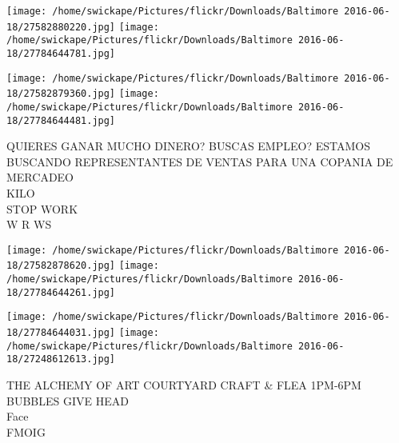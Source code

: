 \documentclass[10pt,letterpaper]{article}
\begin{document}
\texttt{[image: /home/swickape/Pictures/flickr/Downloads/Baltimore 2016-06-18/27582880220.jpg]}
\texttt{[image: /home/swickape/Pictures/flickr/Downloads/Baltimore 2016-06-18/27784644781.jpg]}

\texttt{[image: /home/swickape/Pictures/flickr/Downloads/Baltimore 2016-06-18/27582879360.jpg]}
\texttt{[image: /home/swickape/Pictures/flickr/Downloads/Baltimore 2016-06-18/27784644481.jpg]}

QUIERES GANAR MUCHO DINERO?  BUSCAS EMPLEO?  ESTAMOS BUSCANDO REPRESENTANTES DE VENTAS PARA UNA COPANIA DE MERCADEO\\
KILO\\
STOP WORK\\
W R WS\\
\pagebreak

\texttt{[image: /home/swickape/Pictures/flickr/Downloads/Baltimore 2016-06-18/27582878620.jpg]}
\texttt{[image: /home/swickape/Pictures/flickr/Downloads/Baltimore 2016-06-18/27784644261.jpg]}

\texttt{[image: /home/swickape/Pictures/flickr/Downloads/Baltimore 2016-06-18/27784644031.jpg]}
\texttt{[image: /home/swickape/Pictures/flickr/Downloads/Baltimore 2016-06-18/27248612613.jpg]}

THE ALCHEMY OF ART COURTYARD CRAFT \& FLEA 1PM{-}6PM\\
BUBBLES GIVE HEAD\\
Face\\
FMOIG\\
\pagebreak
\end{document}

